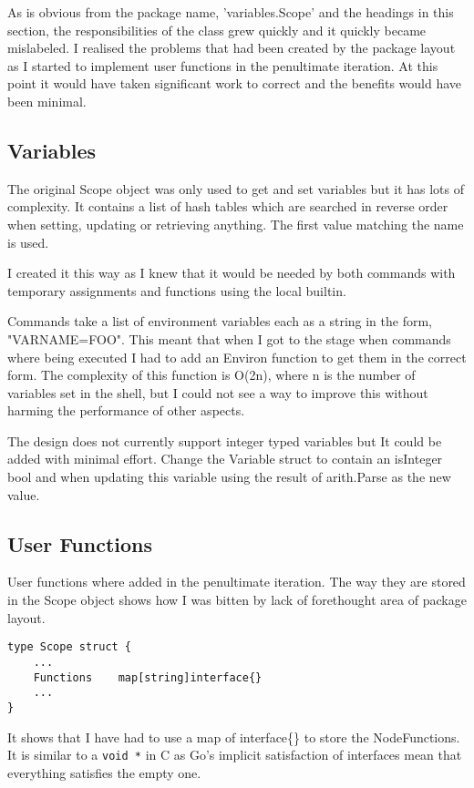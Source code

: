 As is obvious from the package name, 'variables.Scope' and the headings in this section, the responsibilities of the class grew quickly and it quickly became mislabeled.
I realised the problems that had been created by the package layout
as I started to implement user functions in the penultimate iteration.
At this point it would have taken significant work to correct and the benefits would have been minimal.

\subsection{Variables}
The original Scope object was only used to get and set variables but it has lots of complexity.
It contains a list of hash tables which are searched in reverse order when setting, updating or retrieving anything.
The first value matching the name is used.

I created it this way as I knew that it would be needed by both commands with temporary assignments and functions using the local builtin.

Commands take a list of environment variables each as a string in the form, "VARNAME=FOO".
This meant that when I got to the stage when commands where being executed I had to add an Environ function to get them in the correct form.
The complexity of this function is O(2n), where n is the number of variables set in the shell, but I could not see a way to improve this without harming the performance of other aspects.

The design does not currently support integer typed variables but It could be added with minimal effort.
Change the Variable struct to contain an isInteger bool and when updating this variable using the result of arith.Parse as the new value. 
\subsection{User Functions}
User functions where added in the penultimate iteration.
The way they are stored in the Scope object shows how I was bitten by lack of forethought area of package layout.

\begin{verbatim}
type Scope struct {
	...
	Functions    map[string]interface{}
	...
}
\end{verbatim}

It shows that I have had to use a map of interface\{\} to store the NodeFunctions.
It is similar to a \verb!void *! in C as Go's implicit satisfaction of interfaces mean that everything satisfies the empty one.

